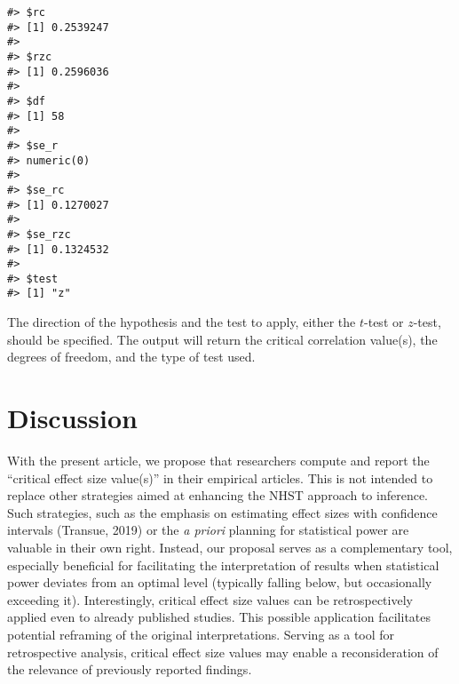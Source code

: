 \documentclass[
  man,floatsintext]{apa7}
\begin{document}
\begin{verbatim}
#> $rc
#> [1] 0.2539247
#> 
#> $rzc
#> [1] 0.2596036
#> 
#> $df
#> [1] 58
#> 
#> $se_r
#> numeric(0)
#> 
#> $se_rc
#> [1] 0.1270027
#> 
#> $se_rzc
#> [1] 0.1324532
#> 
#> $test
#> [1] "z"
\end{verbatim}

\normalsize

The direction of the hypothesis and the test to apply, either the \(t\)-test or \(z\)-test, should be specified. The output will return the critical correlation value(s), the degrees of freedom, and the type of test used.

\section{Discussion}\label{discussion}

With the present article, we propose that researchers compute and report the ``critical effect size value(s)'' in their empirical articles. This is not intended to replace other strategies aimed at enhancing the NHST approach to inference. Such strategies, such as the emphasis on estimating effect sizes with confidence intervals (Transue, 2019) or the \textit{a priori} planning for statistical power are valuable in their own right. Instead, our proposal serves as a complementary tool, especially beneficial for facilitating the interpretation of results when statistical power deviates from an optimal level (typically falling below, but occasionally exceeding it). Interestingly, critical effect size values can be retrospectively applied even to already published studies. This possible application facilitates potential reframing of the original interpretations. Serving as a tool for retrospective analysis, critical effect size values may enable a reconsideration of the relevance of previously reported findings.
\end{document}
